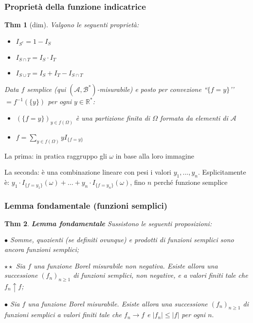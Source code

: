 \documentclass[a4paper,11pt]{article}
\theoremstyle{plain}
\newtheorem{thm}{Thm}[section]
\theoremstyle{definition}
\theoremstyle{remark}
\begin{document}
\subsubsection{Proprietà della funzione indicatrice}
\begin{thm}[dim] Valgono le seguenti proprietà:
\begin{itemize}
    \item  $I_{S^{c}}=1-I_{S}$
    \item $I_{S\cap T}=I_{S}\cdot I_{T}$
    \item $I_{S\cup T}=I_{S}+I_{T}-I_{S\cap T}$
\end{itemize}
Data $f$ semplice (qui $(\mathcal{A,B}^*)$-misurabile) e posto per convezione “$\{f=y\}$’’ $=f^{-1}(\{y\})$ per ogni $y \in \mathbb{R}^{*}$:

\begin{itemize}
    \item $\left(\{f=y\}\right) _{y\in f(\Omega)}$ è una partizione finita di $\Omega$ formata da elementi di $\mathcal{A}$ 
    \item $f=\displaystyle \sum_{y\in f(\Omega)}yI_{\{f=y\}}$
\end{itemize}
\end{thm}
\noindent
La prima: in pratica raggruppo gli $\omega$ in base alla loro immagine

\noindent
La seconda: è una combinazione lineare con pesi i valori $y_1,...,y_n$. Esplicitamente è: $y_1 \cdot I_{\{f=y_1 \}}
(\omega)+...+y_n \cdot  
I_{\{f=y_n\}} 
(\omega)$, fino $n$ perché funzione semplice



\subsubsection{Lemma fondamentale (funzioni semplici)}
\begin{thm}  \textbf{Lemma fondamentale} Sussistono le seguenti proposizioni:

$\bullet$ Somme, quozienti (se definiti ovunque) e prodotti di funzioni semplici sono ancora funzioni semplici;

$\star \star$ Sia $f$ una funzione Borel misurabile non negativa. Esiste allora una successione $(f_{n})_{n\geq 1}$ di funzioni semplici, non negative, e a valori finiti tale che $f_{n}\uparrow f$;

$\bullet$ Sia $f$ una funzione Borel misurabile. Esiste allora una successione $(f_{n})_{n\geq 1}$ di funzioni semplici a valori finiti tale che $f_{n}\rightarrow f$ e $|f_{n}|\leq|f|$ per ogni $n.$
\end{thm}
\end{document}
